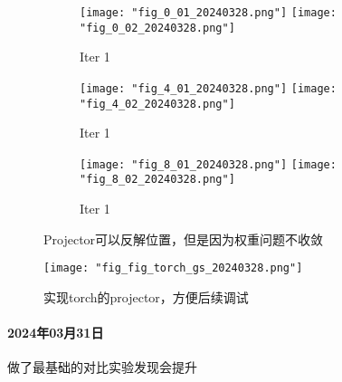 \begin{figure}
    \begin{subfigure}{0.8\linewidth}
        \texttt{[image: "fig\_0\_01\_20240328.png"]}
        \texttt{[image: "fig\_0\_02\_20240328.png"]}
        \caption{Iter 1}
    \end{subfigure}
    \begin{subfigure}{0.8\linewidth}
        \texttt{[image: "fig\_4\_01\_20240328.png"]}
        \texttt{[image: "fig\_4\_02\_20240328.png"]}
        \caption{Iter 1}
    \end{subfigure}
    \begin{subfigure}{0.8\linewidth}
        \texttt{[image: "fig\_8\_01\_20240328.png"]}
        \texttt{[image: "fig\_8\_02\_20240328.png"]}
        \caption{Iter 1}
    \end{subfigure}
    \caption{Projector可以反解位置，但是因为权重问题不收敛}
\end{figure}

\begin{figure}
    \texttt{[image: "fig\_fig\_torch\_gs\_20240328.png"]}
    \caption{实现torch的projector，方便后续调试}
\end{figure}

\paragraph{2024年03月31日}

做了最基础的对比实验发现会提升

